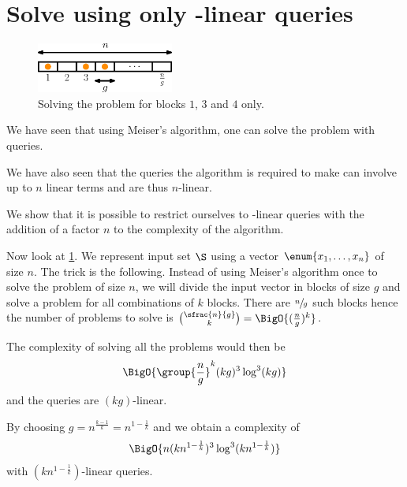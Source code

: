 \section{Solve \kSUM using only -linear queries}


\begin{figure}
\centering
\includegraphics[width=0.4\textwidth]{fig/point-location/blocks}
\caption{Solving the problem for blocks \(1\), \(3\) and \(4\) only.}
\label{fig:point-location:on:blocks}
\end{figure}

We have seen that using Meiser's algorithm, one can solve the \kSUM problem
with  queries.

We have also seen that the queries the algorithm is required to make can
involve up to \(n\) linear terms and are thus \(n\)-linear.

We show that it is possible to restrict ourselves to -linear queries
with the addition of a factor \(n\) to the complexity of the algorithm.

Now look at \ref{fig:point-location:on:blocks}. We represent input set \(\S\)
using a vector \(\enum{x_1,\ldots,x_n}\) of size \(n\). The trick is the
following. Instead of using Meiser's algorithm once to solve the problem of
size \(n\), we will divide the input vector in blocks of size \(g\) and solve a
\kSUM problem for all combinations of \(k\) blocks.  There are \(\sfrac{n}{g}\)
such blocks hence the number of problems to solve is \(\binom{\sfrac{n}{g}}{k}
= \BigO{(\frac{n}{g})^k} \).

The complexity of solving all the problems would then be
\begin{displaymath}
\BigO{\group{\frac{n}{g}}^k (kg)^3 \log^3 (kg) }
\end{displaymath}
and the queries are \((kg)\)-linear.

By choosing \(g = n^{\frac{k-1}{k}} = n^{1-\frac{1}{k}}\) and we obtain a
complexity of
\begin{displaymath}
\BigO{n (kn^{1-\frac{1}{k}})^3 \log^3 (kn^{1-\frac{1}{k}}) }
\end{displaymath}
with \((kn^{1-\frac{1}{k}})\)-linear queries.


